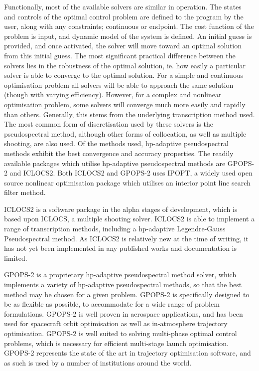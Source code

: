 Functionally, most of the available solvers are similar in operation. The states and controls of the optimal control problem are defined to the program by the user, along with any constraints; continuous or endpoint. The cost function of the problem is input, and dynamic model of the system is defined. An initial guess is provided, and once activated, the solver will move toward an optimal solution from this initial guess. 
The most significant practical difference between the solvers lies in the robustness of the optimal solution, ie. how easily a particular solver is able to converge to the optimal solution. For a simple and continuous optimisation problem all solvers will be able to approach the same solution (though with varying efficiency). However, for a complex and nonlinear optimisation problem, some solvers will converge much more easily and rapidly than others. Generally, this stems from the underlying transcription method used. 
The most common form of discretisation used by these solvers is the pseudospectral method, although other forms of collocation, as well as multiple shooting, are also used. Of the methods used, \textsf{hp}-adaptive pseudospectral methods exhibit the best convergence and accuracy properties\cite{Chai2015}. The readily available packages which utilise \textsf{hp}-adaptive pseudospectral methods are GPOPS-2\cite{Rao2010} and ICLOCS2\cite{iclocs}. Both ICLOCS2 and GPOPS-2 uses IPOPT\cite{Wachter2006}, a widely used open source nonlinear optimisation package which utilises an interior point line search filter method. 

ICLOCS2 is a software package in the alpha stages of development, which is based upon ICLOCS, a multiple shooting solver\cite{iclocs}. ICLOCS2 is able to implement a range of transcription methods, including a \textsf{hp}-adaptive Legendre-Gauss Pseudospectral method\cite{iclocs}. As ICLOCS2 is relatively new at the time of writing, it has not yet been implemented in any published works and documentation is limited. 

GPOPS-2 is a proprietary \textsf{hp}-adaptive pseudospectral method solver, which implements a variety of \textsf{hp}-adaptive pseudospectral methods, so that the best method may be chosen for a given problem\cite{Rao2010}. GPOPS-2 is specifically designed to be as flexible as possible, to accommodate for a wide range of problem formulations\cite{Rao2010}. GPOPS-2 is well proven in aerospace applications, and has been used for spacecraft orbit optimisation as well as in-atmosphere trajectory optimisation\cite{Rizvi2015,Lipp2014}. GPOPS-2 is well suited to solving multi-phase optimal control problems, which is necessary for efficient multi-stage launch optimisation\cite{Rao2010}. GPOPS-2 represents the state of the art in trajectory optimisation software, and as such is used by a number of institutions around the world. 



